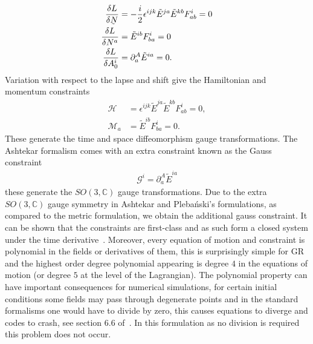 \documentclass[10pt]{report}
\newcommand{\pleb}[0]{Pleba\'nski}
\newcommand{\utilde}[1]{\underaccent{\tilde}{#1}}
\theoremstyle{definition}
\newcommand{\C}[0]{\mathbb{C}}
\newcommand{\tE}[0]{\tilde{E}}
\newcommand{\dlap}[0]{\utilde{N}}
\begin{document}
    \begin{align}
        \frac{\delta L}{\delta \dlap} & = -\frac{i}{2} \epsilon^{ijk} \tE^{ja} \tE^{kb} F^i_{ab} = 0 \\
        \frac{\delta L}{\delta N^a} & = \tE^{ib} F^i_{ba} = 0 \\
        \frac{\delta L}{\delta A^i_0} & = \partial_a^A \tE^{ia} = 0.
    \end{align}
    Variation with respect to the lapse and shift give the Hamiltonian and momentum constraints 
    \begin{align}
        \mathcal{H} & = \epsilon^{ijk} \tE^{ja} \tE^{kb} F^i_{ab} = 0, \\
        \mathcal{M}_a & = \tE^{ib} F^i_{ba} = 0.
    \end{align}
    These generate the time and space diffeomorphism gauge transformations. The Ashtekar formalism comes with an extra constraint known as the Gauss constraint 
    \begin{align}
        \mathcal{G}^i = \partial^A_a \tE^{ia}
    \end{align}
    these generate the $SO(3,\C)$ gauge transformations. Due to the extra $SO(3,\C)$ gauge symmetry in Ashtekar and \pleb{}'s formulations, as compared to the metric formulation, we obtain the additional gauss constraint. It can be shown that the constraints are first-class and as such form a closed system under the time derivative~\cite{Hamiltonian_Ana_Buffen_2004}. Moreover, every equation of motion and constraint is polynomial in the fields or derivatives of them, this is surprisingly simple for GR and the highest order degree polynomial appearing is degree $4$ in the equations of motion (or degree $5$ at the level of the Lagrangian). The polynomial property can have important consequences for numerical simulations, for certain initial conditions some fields may pass through degenerate points and in the standard formalisms one would have to divide by zero, this causes equations to diverge and codes to crash, see section 6.6 of~\cite{AlcubierreMiguelIntro3+12008}. In this formulation as no division is required this problem does not occur.
\end{document}

